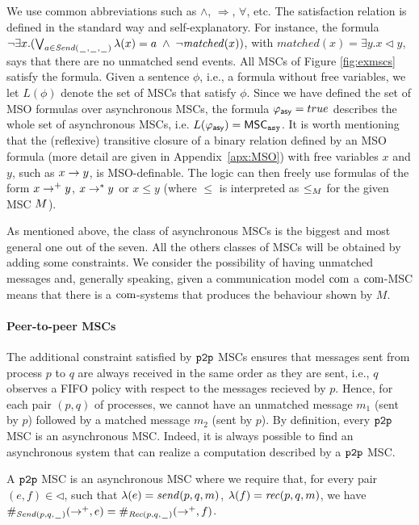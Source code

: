 We use common abbreviations such as $\wedge$, $\Rightarrow$, $\forall$, etc. The satisfaction relation is defined in the standard way and self-explanatory.
For instance, the formula $\neg\exists x.(\bigvee_{a \in \sAct} \lambda(x) = a \;\wedge\; \neg \mathit{matched}(x))$, 
with $\mathit{matched}(x) = \exists y.x \lhd y$, 
says that there are no unmatched send events. All MSCs of Figure \ref{fig:exmscs} satisfy the formula. Given a sentence $\phi$, i.e., a formula without free variables,
we let $L(\phi)$ denote the set of MSCs that satisfy $\phi$. Since we have defined the set of MSO formulas over asynchronous MSCs, the formula $\asformula = true$ describes the whole set of asynchronous MSCs, i.e. $L(\asformula) = \asMSCs$. It is worth mentioning that the (reflexive) transitive closure of a binary relation defined by an MSO formula (more detail are given in Appendix~\ref{apx:MSO}) with free variables $x$ and $y$, such as $x \procrel y$, is MSO-definable. The logic can then freely use formulas of the form $x \procrel^+ y$, $x \procrel^* y$ or $x \le y$ (where $\le$ is interpreted as $\le_\msc$ for the given MSC $\msc$).

As mentioned above, the class of asynchronous MSCs is the biggest and most general one out of the seven. All the others classes of MSCs will be obtained by adding some constraints. We consider the possibility of having unmatched messages and, generally speaking, given a communication model $\comsymb$ a $\comsymb$-MSC means that there is a $\comsymb$-systems that produces the behaviour shown by $M$.


\paragraph{\bf Peer-to-peer MSCs}
The additional constraint satisfied by $\oneone$ MSCs ensures that messages sent from  process $p$ to  $q$ are always received in the same order as they are sent, i.e., $q$ observes a FIFO policy with respect to the messages recieved by $p$.  Hence, for each pair $(p,q)$ of processes, we cannot have an unmatched message $m_1$ (sent by $p$) followed by a matched message $m_2$ (sent by $p$).  By definition, every $\oneone$ MSC is an asynchronous MSC. Indeed, it is always possible to find an asynchronous system that can realize a computation described by a $\oneone$ MSC. 
\begin{definition}
A $\oneone$ MSC is an asynchronous MSC where we require that, for every pair $(e,f) \in {\lhd}$, such that $\lambda(e) = \sact{p}{q}{\msg}$, $\lambda(f) = \ract{p}{q}{\msg}$, we have $\sametype{e}{\pqsAct{p}{q}}{\procrel^+} = \sametype{f}{\pqrAct{p}{q}}{\procrel^+}$.
\end{definition}

